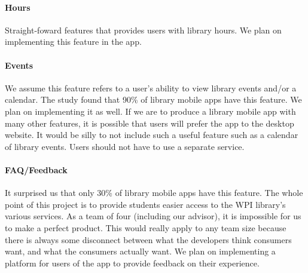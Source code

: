     \paragraph{Hours}
    Straight-foward features that provides users with library hours. We plan on implementing this feature in the \appname app.
    \paragraph{Events}
    We assume this feature refers to a user's ability to view library events and/or a calendar. The study found that 90\% of library mobile apps have this feature. We plan on implementing it as well. If we are to produce a library mobile app with many other features, it is possible that users will prefer the app to the desktop website. It would be silly to not include such a useful feature such as a calendar of library events. Users should not have to use a separate service.
    \paragraph{FAQ/Feedback}
    It surprised us that only 30\% of library mobile apps have this feature. The whole point of this project is to provide students easier access to the WPI library's various services. As a team of four (including our advisor), it is impossible for us to make a perfect product. This would really apply to any team size because there is always some disconnect between what the developers think consumers want, and what the consumers actually want. We plan on implementing a platform for users of the \appname app to provide feedback on their experience.

